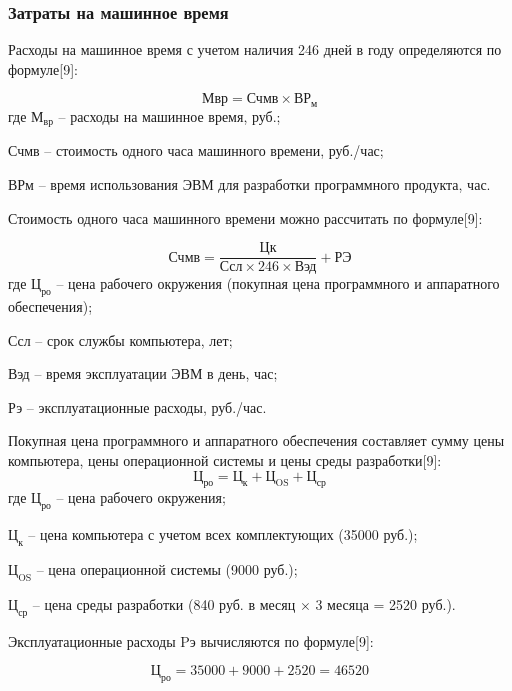 \documentclass[a4paper]{extarticle}
\numberwithin{equation}{section}
\begin{document}
\subsubsection{Затраты на машинное время}
Расходы на машинное время с учетом наличия 246 дней в году определяются по формуле[9]:\par
\begin{equation}
\label{form6}
	\text{Мвр}=\text{Счмв}\times \text{ВР}_\text{м}
\end{equation}
где $\text{М}_\text{вр}$ – расходы на машинное время, руб.;\par
Счмв – стоимость одного часа машинного времени, руб./час;\par
ВРм – время использования ЭВМ для разработки программного продукта, час.\par
Стоимость одного часа машинного времени можно рассчитать по формуле[9]:\par
\begin{equation}
\label{form7}
	\text{Счмв}=\frac{\text{Цк}}{\text{Ссл}\times 246\times \text{Вэд}}+\text{РЭ}
\end{equation}
где $\text{Ц}_\text{ро}$ – цена рабочего окружения (покупная цена программного и аппаратного обеспечения);\par
Ссл – срок службы компьютера, лет;\par
Вэд – время эксплуатации ЭВМ в день, час;\par
Рэ – эксплуатационные расходы, руб./час.\par
Покупная цена программного и аппаратного обеспечения составляет сумму цены компьютера, цены операционной системы и цены среды разработки[9]:
\begin{equation}
	\text{Ц}_\text{ро} = \text{Ц}_\text{к}+\text{Ц}_\text{OS}+\text{Ц}_\text{ср}
\end{equation}
где $\text{Ц}_\text{ро}$ – цена рабочего окружения;\par
$\text{Ц}_\text{к}$ – цена компьютера с учетом всех комплектующих (35000 руб.);\par
$\text{Ц}_\text{OS}$ – цена операционной системы (9000 руб.);\par
$\text{Ц}_\text{ср}$ – цена среды разработки (840 руб. в месяц $\times$ 3 месяца = 2520 руб.).\par
Эксплуатационные расходы Pэ вычисляются по формуле[9]:\par
\begin{equation}
	\text{Ц}_\text{ро} = 35000+9000+2520=46520
\end{equation}
\end{document}

